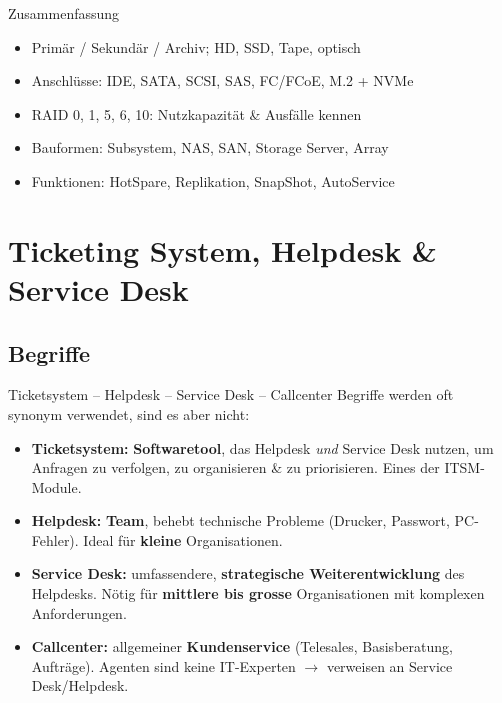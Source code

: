\documentclass[a4paper, fontsize=7pt]{scrartcl}
\begin{document}
\begin{subbox}{Zusammenfassung}
\begin{itemize}
    \item Primär / Sekundär / Archiv; HD, SSD, Tape, optisch
    \item Anschlüsse: IDE, SATA, SCSI, SAS, FC/FCoE, M.2 + NVMe
    \item RAID 0, 1, 5, 6, 10: Nutzkapazität \& Ausfälle kennen
    \item Bauformen: Subsystem, NAS, SAN, Storage Server, Array
    \item Funktionen: HotSpare, Replikation, SnapShot, AutoService
\end{itemize}
\end{subbox}

\section{Ticketing System, Helpdesk \& Service Desk}

\subsection{Begriffe}

\begin{mainbox}{Ticketsystem -- Helpdesk -- Service Desk -- Callcenter}
Begriffe werden oft synonym verwendet, sind es aber nicht:
\begin{itemize}
    \item \textbf{Ticketsystem:} \textbf{Softwaretool}, das Helpdesk \emph{und}
          Service Desk nutzen, um Anfragen zu verfolgen, zu organisieren \& zu
          priorisieren. Eines der ITSM-Module.
    \item \textbf{Helpdesk:} \textbf{Team}, behebt technische Probleme
          (Drucker, Passwort, PC-Fehler). Ideal für \textbf{kleine}
          Organisationen.
    \item \textbf{Service Desk:} umfassendere, \textbf{strategische
          Weiterentwicklung} des Helpdesks. Nötig für \textbf{mittlere bis
          grosse} Organisationen mit komplexen Anforderungen.
    \item \textbf{Callcenter:} allgemeiner \textbf{Kundenservice} (Telesales,
          Basisberatung, Aufträge). Agenten sind keine IT-Experten
          $\to$ verweisen an Service Desk/Helpdesk.
\end{itemize}
\end{mainbox}
\end{document}
